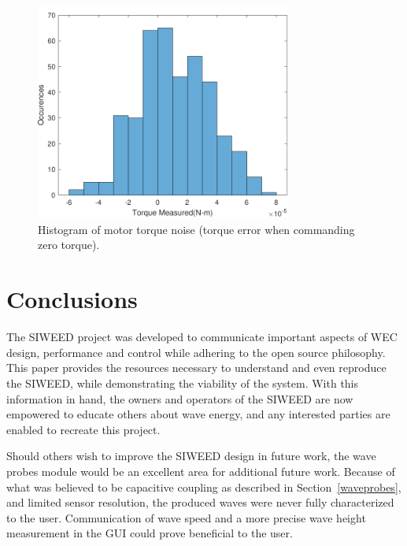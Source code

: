 \documentclass[hardware,article,submit,pdftex,moreauthors]{Definitions/mdpi}
\begin{document}
\begin{figure}[tb]
  \centering
  \includegraphics[width=0.75\textwidth]{diagrams/NoiseHistogram.pdf}
  \caption{Histogram of motor torque noise (torque error when commanding zero torque).}
  \label{fig:NoiseHistogram}
\end{figure}

\section{Conclusions}
The SIWEED project was developed to communicate important aspects of WEC design, performance and control while adhering to the open source philosophy. 
This paper provides the resources necessary to understand and even reproduce the SIWEED, while demonstrating the viability of the system. 
With this information in hand, the owners and operators of the SIWEED are now empowered to educate others about wave energy, and any interested parties are enabled to recreate this project.

Should others wish to improve the SIWEED design in future work, the wave probes module would be an excellent area for additional future work.
Because of what was believed to be capacitive coupling as described in Section~\ref{waveprobes}, and limited sensor resolution, the produced waves were never fully characterized to the user.
Communication of wave speed and a more precise wave height measurement in the GUI could prove beneficial to the user. 

\end{document}
